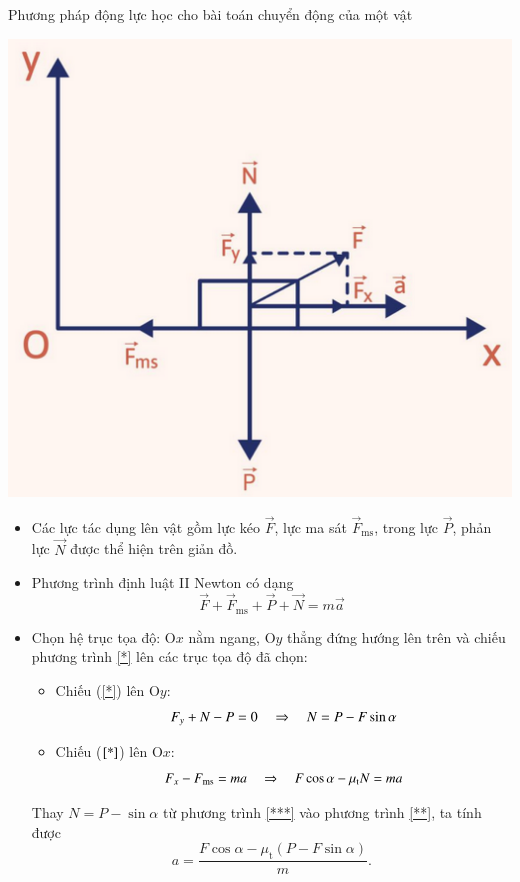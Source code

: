 \begin{dang}{Phương pháp động lực học cho bài toán chuyển động của một vật}
{{\begin{center}
		\includegraphics[scale=0.5]{../figs/G10-17-1}
	\end{center}
	
	\begin{itemize}
		\item Các lực tác dụng lên vật gồm lực kéo $\vec F$, lực ma sát $\vec F_\text{ms}$, trong lực $\vec P$, phản lực $\vec N$ được thể hiện trên giản đồ. 
		
		\item Phương trình định luật II Newton có dạng 
		\begin{equation}\label{*}
			\vec F +\vec F_\text{ms} + \vec P + \vec N = m \vec a
		\end{equation}
		
		\item Chọn hệ trục tọa độ: O$x$ nằm ngang, O$y$ thẳng đứng hướng lên trên và chiếu phương trình \eqref{*} lên các trục tọa độ đã chọn:
		\begin{itemize}
			\item Chiếu (\ref{*}) lên O$y$:
			\begin{equation}\label{***}
				F_y + N - P = 0 \\
				\quad\Rightarrow\quad N = P - F\sin \alpha
			\end{equation}
			\item Chiếu ($\ref{*}$) lên O$x$:
			\begin{equation}\label{**}
				F_x - F_\text{ms} = ma \\
				\quad\Rightarrow\quad F \cos \alpha - \mu_\text{t} N = ma
			\end{equation}
		\end{itemize}
		Thay $N = P - \sin \alpha$ từ phương trình \eqref{***} vào phương trình \eqref{**}, ta tính được 
		$$a=\dfrac{F \cos \alpha - \mu_\text{t} (P-F\sin \alpha)}{m}.$$
	\end{itemize}
}}



\end{dang}
